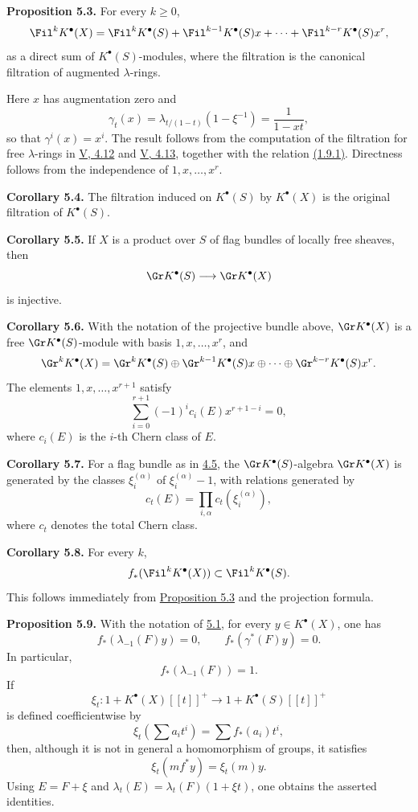 \textbf{Proposition 5.3.} For every \(k\geq 0\),
\[
  \Fil^k K^\bullet(X)
  =
  \Fil^k K^\bullet(S)
  +\Fil^{k-1}K^\bullet(S)x+\cdots+\Fil^{k-r}K^\bullet(S)x^r,
\]
as a direct sum of \(K^\bullet(S)\)-modules, where the filtration is the canonical filtration of augmented \(\lambda\)-rings.

Here \(x\) has augmentation zero and
\[
  \gamma_t(x)=\lambda_{t/(1-t)}(1-\xi^{-1})=\frac{1}{1-xt},
\]
so that \(\gamma^i(x)=x^i\). The result follows from the computation of the filtration for free \(\lambda\)-rings in \hyperlink{sga6.e05.prop.4-12}{V, 4.12} and \hyperlink{sga6.e05.rem.4-13}{V, 4.13}, together with the relation \hyperlink{sga6.e06.eq.1-9-1}{(1.9.1)}. Directness follows from the independence of \(1,x,\ldots,x^r\).

\textbf{Corollary 5.4.} The filtration induced on \(K^\bullet(S)\) by \(K^\bullet(X)\) is the original filtration of \(K^\bullet(S)\).

\textbf{Corollary 5.5.} If \(X\) is a product over \(S\) of flag bundles of locally free sheaves, then
\[
  \Gr K^\bullet(S)\longrightarrow \Gr K^\bullet(X)
\]
is injective.

\textbf{Corollary 5.6.} With the notation of the projective bundle above, \(\Gr K^\bullet(X)\) is a free \(\Gr K^\bullet(S)\)-module with basis \(1,x,\ldots,x^r\), and
\[
  \Gr^k K^\bullet(X)
  =\Gr^kK^\bullet(S)\oplus\Gr^{k-1}K^\bullet(S)x\oplus\cdots\oplus\Gr^{k-r}K^\bullet(S)x^r.
\]
The elements \(1,x,\ldots,x^{r+1}\) satisfy
\[
  \sum_{i=0}^{r+1}(-1)^i c_i(E)x^{r+1-i}=0,
\]
where \(c_i(E)\) is the \(i\)-th Chern class of \(E\).

\textbf{Corollary 5.7.} For a flag bundle as in \hyperlink{sga6.e06.sec.4.5}{4.5}, the \(\Gr K^\bullet(S)\)-algebra \(\Gr K^\bullet(X)\) is generated by the classes \(\xi_i^{(\alpha)}\) of \(\xi_i^{(\alpha)}-1\), with relations generated by
\[
  c_t(E)=\prod_{i,\alpha}c_t(\xi_i^{(\alpha)}),
\]
where \(c_t\) denotes the total Chern class.

\textbf{Corollary 5.8.} For every \(k\),
\[
  f_*(\Fil^k K^\bullet(X))\subset \Fil^k K^\bullet(S).
\]
This follows immediately from \hyperlink{sga6.e06.prop.5-3}{Proposition 5.3} and the projection formula.

\textbf{Proposition 5.9.} With the notation of \hyperlink{sga6.e06.sec.5.1}{5.1}, for every \(y\in K^\bullet(X)\), one has
\[
  f_*(\lambda_{-1}(F)y)=0,
  \qquad
  f_*(\gamma^*(F)y)=0.
\]
In particular,
\[
  f_*(\lambda_{-1}(F))=1.
\]
If
\[
  \xi_t:1+K^\bullet(X)[[t]]^+\longrightarrow 1+K^\bullet(S)[[t]]^+
\]
is defined coefficientwise by
\[
  \xi_t\left(\sum a_i t^i\right)=\sum f_*(a_i)t^i,
\]
then, although it is not in general a homomorphism of groups, it satisfies
\[
  \xi_t(mf^*y)=\xi_t(m)y.
\]
Using \(E=F+\xi\) and \(\lambda_t(E)=\lambda_t(F)(1+\xi t)\), one obtains the asserted identities.

